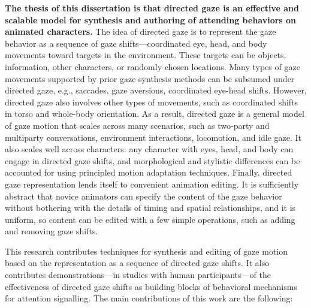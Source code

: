 \textbf{The thesis of this dissertation is that directed gaze is an effective and scalable model for synthesis and authoring of attending behaviors on animated characters.} The idea of directed gaze is to represent the gaze behavior as a sequence of gaze shifts---coordinated eye, head, and body movements toward targets in the environment. These targets can be objects, information, other characters, or randomly chosen locations. Many types of gaze movements supported by prior gaze synthesis methods can be subsumed under directed gaze, e.g., saccades, gaze aversions, coordinated eye-head shifts. However, directed gaze also involves other types of movements, such as coordinated shifts in torso and whole-body orientation. As a result, directed gaze is a general model of gaze motion that scales across many scenarios, such as two-party and multiparty conversations, environment interactions, locomotion, and idle gaze. It also scales well across characters: any character with eyes, head, and body can engage in directed gaze shifts, and morphological and stylistic differences can be accounted for using principled motion adaptation techniques. Finally, directed gaze representation lends itself to convenient animation editing. It is sufficiently abstract that novice animators can specify the content of the gaze behavior without bothering with the details of timing and spatial relationships, and it is uniform, so content can be edited with a few simple operations, such as adding and removing gaze shifts.

This research contributes techniques for synthesis and editing of gaze motion based on the representation as a sequence of directed gaze shifts. It also contributes demonstrations---in studies with human participants---of the effectiveness of directed gaze shifts as building blocks of behavioral mechanisms for attention signalling. The main contributions of this work are the following:

